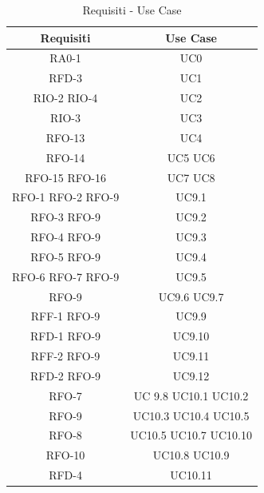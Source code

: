 \newpage

\begin{table}[h]
\begin{center}
     \begin{tabular}
           {@{\extracolsep{\fill}}|c|c|}
     \hline
      \textbf{Requisiti} & \textbf{Use Case} \\
      \hline
     RA0-1 & UC0 \\
     \hline
     RFD-3 & UC1  \\
     \hline
     RIO-2  RIO-4 & UC2\\
     \hline
     RIO-3 & UC3 \\
     \hline
     RFO-13 & UC4 \\
     \hline
     RFO-14 & UC5 UC6 \\
      \hline
     RFO-15 RFO-16 & UC7 UC8 \\
     \hline
     RFO-1 RFO-2 RFO-9 & UC9.1 \\
     \hline
     RFO-3 RFO-9 &  UC9.2 \\
     \hline
     RFO-4 RFO-9 & UC9.3 \\
     \hline
     RFO-5 RFO-9 & UC9.4 \\
     \hline
     RFO-6 RFO-7 RFO-9 & UC9.5 \\
     \hline
     RFO-9 & UC9.6 UC9.7 \\
     \hline
     RFF-1 RFO-9 & UC9.9 \\
     \hline
     RFD-1 RFO-9 & UC9.10 \\
     \hline
     RFF-2 RFO-9 & UC9.11 \\
     \hline 
     RFD-2 RFO-9 & UC9.12 \\
     \hline
     RFO-7 & UC 9.8 UC10.1 UC10.2 \\
     \hline
     RFO-9 & UC10.3 UC10.4 UC10.5 \\
     \hline
     RFO-8 & UC10.5 UC10.7 UC10.10 \\
     \hline
     RFO-10 & UC10.8 UC10.9 \\
     \hline
     RFD-4 & UC10.11 \\
     
    \hline %
    \end{tabular}
  \caption{Requisiti - Use Case} %
  \label{tab:requisiti}
  \end{center}
\end{table}
